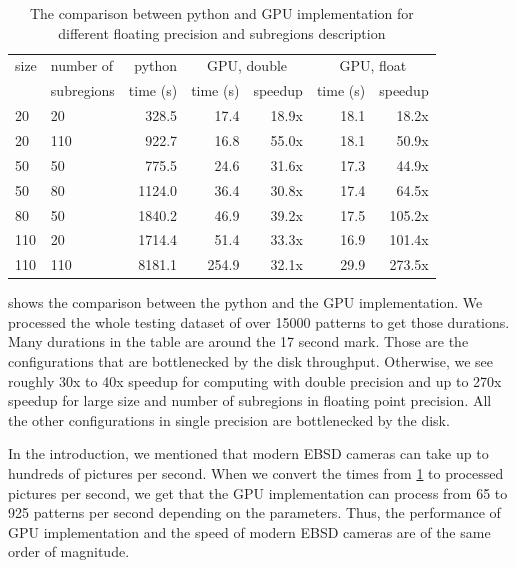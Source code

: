 \begin{table}[]
	\centering
	\begin{tabular}{@{}ll|r|rr|rr@{}}
		size & number of  &                        python & \multicolumn{2}{c|}{GPU, double} & \multicolumn{2}{c}{GPU, float} \\
		     & subregions & \multicolumn{1}{c|}{time (s)} & time (s) &               speedup & time (s) &             speedup \\ \midrule
		20   & 20         &                         328.5 &     17.4 &                 18.9x &     18.1 &               18.2x \\
		20   & 110        &                         922.7 &     16.8 &                 55.0x &     18.1 &               50.9x \\
		50   & 50         &                         775.5 &     24.6 &                 31.6x &     17.3 &               44.9x \\
		50   & 80         &                        1124.0 &     36.4 &                 30.8x &     17.4 &               64.5x \\
		80   & 50         &                        1840.2 &     46.9 &                 39.2x &     17.5 &              105.2x \\
		110  & 20         &                        1714.4 &     51.4 &                 33.3x &     16.9 &              101.4x \\
		110  & 110        &                        8181.1 &    254.9 &                 32.1x &     29.9 &              273.5x
	\end{tabular}
	\caption{The comparison between python and GPU implementation for different floating precision and subregions description}
	\label{full-size-table}
\end{table}

 shows the comparison between the python and the GPU implementation. We processed the whole testing dataset of over 15000 patterns to get those durations. Many durations in the table are around the 17 second mark. Those are the configurations that are bottlenecked by the disk throughput. Otherwise, we see roughly 30x to 40x speedup for computing with double precision and up to 270x speedup for large size and number of subregions in floating point precision. All the other configurations in single precision are bottlenecked by the disk.

In the introduction, we mentioned that modern EBSD cameras can take up to hundreds of pictures per second. When we convert the times from \cref{full-size-table} to processed pictures per second, we get that the GPU implementation can process from 65 to 925 patterns per second depending on the parameters. Thus, the performance of GPU implementation and the speed of modern EBSD cameras are of the same order of magnitude.


